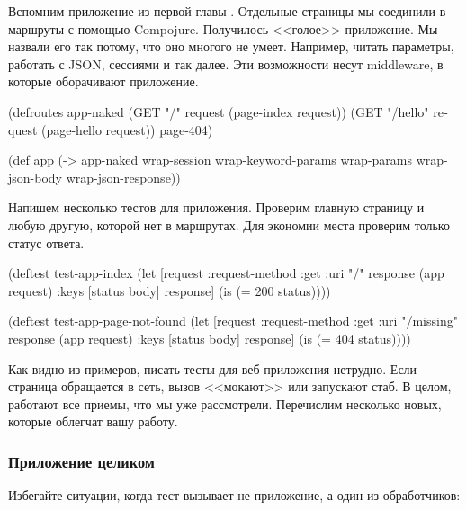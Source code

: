 Вспомним приложение из первой главы . Отдельные страницы мы
соединили в маршруты с помощью Compojure. Получилось <<голое>> приложение. Мы
назвали его так потому, что оно многого не умеет. Например, читать параметры,
работать с JSON, сессиями и так далее. Эти возможности несут middleware, в
которые оборачивают приложение.

\begin{english}
  \begin{clojure}
(defroutes app-naked
  (GET "/"      request (page-index request))
  (GET "/hello" request (page-hello request))
  page-404)

(def app
  (-> app-naked
      wrap-session
      wrap-keyword-params
      wrap-params
      wrap-json-body
      wrap-json-response))
  \end{clojure}
\end{english}

Напишем несколько тестов для приложения. Проверим главную страницу и любую
другую, которой нет в маршрутах. Для экономии места проверим только статус
ответа.

\begin{english}
  \begin{clojure}
(deftest test-app-index
  (let [request {:request-method :get :uri "/"}
        response (app request)
        {:keys [status body]} response]
    (is (= 200 status))))

(deftest test-app-page-not-found
  (let [request {:request-method :get :uri "/missing"}
        response (app request)
        {:keys [status body]} response]
    (is (= 404 status))))
  \end{clojure}
\end{english}

Как видно из примеров, писать тесты для веб-приложения нетрудно. Если страница
обращается в сеть, вызов <<мокают>> или запускают стаб. В целом, работают все
приемы, что мы уже рассмотрели. Перечислим несколько новых, которые облегчат
вашу работу.

\subsubsection*{Приложение целиком}

Избегайте ситуации, когда тест вызывает не приложение, а один из
обработчиков:

